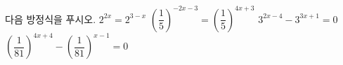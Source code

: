 다음 방정식을 푸시오.
 $2^{2x}=2^{3-x}$
 $\left(\dfrac{1}{5}\right)^{-2x-3}=\left(\dfrac{1}{5}\right)^{4x+3}$
 $3^{2x-4}-3^{3x+1}=0$
 $\left(\dfrac{1}{81}\right)^{4x+4}-\left(\dfrac{1}{81}\right)^{x-1}=0$
